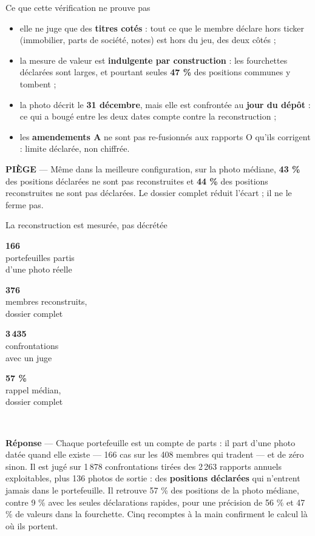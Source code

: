 \documentclass[11pt,aspectratio=169]{beamer}
\newcommand{\tuile}[3]{%
  \begin{minipage}[t]{0.23\textwidth}\centering
    \colorbox{#1}{\parbox[c][20mm][c]{\dimexpr\linewidth-8pt}{\centering
      {\color{white}\Large\textbf{#2}}\\[0.5mm]{\color{white}\footnotesize #3}}}
  \end{minipage}}
\newcommand{\repband}[1]{%
  \colorbox{okgreen!12}{\parbox{\dimexpr\textwidth-10pt}{\scriptsize
    \textbf{\textcolor{okgreen}{Réponse}}\; --- #1}}}
\newcommand{\piege}[1]{%
  \colorbox{warnorange!12}{\parbox{\dimexpr\linewidth-8pt}{\scriptsize
    \textbf{\textcolor{warnorange}{PIÈGE}}\; --- #1}}}
\begin{document}
\begin{frame}{Ce que cette vérification ne prouve pas}
  \small
  \begin{itemize}\itemsep3pt
    \item elle ne juge que des \textbf{titres cotés} : tout ce que le membre déclare hors ticker
          (immobilier, parts de société, notes) est hors du jeu, des deux côtés ;
    \item la mesure de valeur est \textbf{indulgente par construction} : les fourchettes déclarées
          sont larges, et pourtant seules \textbf{47 \%} des positions communes y tombent ;
    \item la photo décrit le \textbf{31 décembre}, mais elle est confrontée au \textbf{jour du dépôt} :
          ce qui a bougé entre les deux dates compte contre la reconstruction ;
    \item les \textbf{amendements A} ne sont pas re-fusionnés aux rapports O qu'ils corrigent :
          limite déclarée, non chiffrée.
  \end{itemize}
  \vspace{2mm}
  \piege{Même dans la meilleure configuration, sur la photo médiane, \textbf{43 \%} des positions
  déclarées ne sont pas reconstruites et \textbf{44 \%} des positions reconstruites ne sont pas
  déclarées. Le dossier complet réduit l'écart ; il ne le ferme pas.}
\end{frame}

\begin{frame}{La reconstruction est mesurée, pas décrétée}
  \centering\vspace{2mm}
  \tuile{okgreen}{166}{portefeuilles partis\\ d'une photo réelle}
  \tuile{okgreen}{376}{membres reconstruits,\\ dossier complet}
  \tuile{helec}{3\,435}{confrontations\\ avec un juge}
  \tuile{helec}{57 \%}{rappel médian,\\ dossier complet}\\[6mm]
  \repband{Chaque portefeuille est un compte de parts : il part d'une photo datée quand elle existe
  --- 166 cas sur les 408 membres qui tradent --- et de zéro sinon. Il est jugé sur 1\,878
  confrontations tirées des 2\,263 rapports annuels exploitables, plus 136 photos de sortie : des
  \textbf{positions déclarées} qui n'entrent jamais dans le portefeuille. Il retrouve 57 \% des
  positions de la photo médiane, contre 9 \% avec les seules déclarations rapides, pour une
  précision de 56 \% et 47 \% de valeurs dans la fourchette. Cinq recomptes à la main confirment le
  calcul là où ils portent.}
\end{frame}
\end{document}
